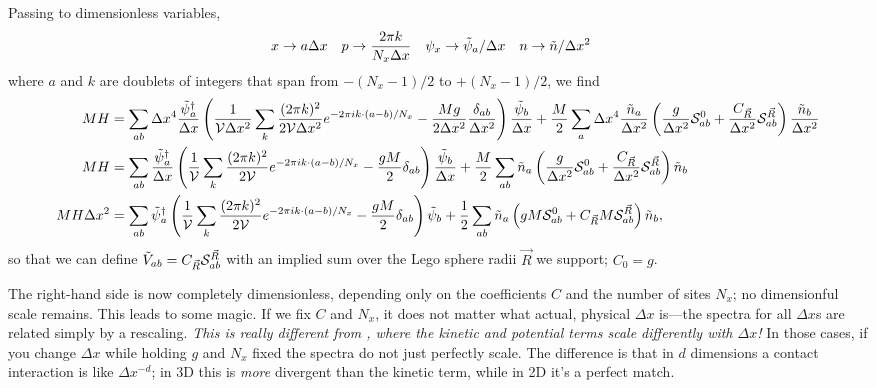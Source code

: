 Passing to dimensionless variables,
\begin{align}
	x & \rightarrow a \Delta x
	&
	p &\rightarrow \frac{2\pi k}{N_x \Delta x}
	&
	\psi_x & \rightarrow \tilde{\psi}_a / \Delta x
	&
	n &\rightarrow \tilde{n} / \Delta x^2
\end{align}
where $a$ and $k$ are doublets of integers that span from $-(N_x-1)/2$ to $+(N_x-1)/2$, we find
\begin{align}
	MH &= 
		\sum_{ab}\Delta x^4 \frac{\tilde{\psi}{}^{\dagger}_a}{\Delta x} \left(
				\frac{1}{\mathcal{V} \Delta x^2} \sum_{k} \frac{(2\pi k)^2}{2 \mathcal{V} \Delta x^2} e^{-2\pi i k \cdot(a-b)/N_x} 
				- \frac{Mg}{2\Delta x^2} \frac{\delta_{ab}}{\Delta x^2}
			\right) \frac{\tilde{\psi}_b}{\Delta x}
		+ \frac{M}{2} \sum_{a} \Delta x^4 \frac{\tilde{n}_a}{\Delta x^2} \left(
				\frac{g}{\Delta x^2} \mathcal{S}^{0}_{ab}
				+ \frac{C_{\vec{R}}}{\Delta x^2} \mathcal{S}^{\vec{R}}_{ab}
			\right) \frac{\tilde{n}_b}{\Delta x^2}
	\\
	MH &=
		\sum_{ab}\frac{\tilde{\psi}{}^{\dagger}_a}{\Delta x} \left(
			\frac{1}{\mathcal{V}} \sum_{k} \frac{(2\pi k)^2}{2 \mathcal{V}} e^{-2\pi i k \cdot(a-b)/N_x} 
			- \frac{gM}{2} \delta_{ab}
			\right) \frac{\tilde{\psi}_b}{\Delta x}
		+ \frac{M}{2} \sum_{ab} \tilde{n}_a \left(
				\frac{g}{\Delta x^2} \mathcal{S}^{0}_{ab}
				+ \frac{C_{\vec{R}}}{\Delta x^2} \mathcal{S}^{\vec{R}}_{ab}
			\right) \tilde{n}_b
	\\
	MH \Delta x^2 &=
		\sum_{ab} \tilde{\psi}{}^{\dagger}_a \left(
			\frac{1}{\mathcal{V}} \sum_{k} \frac{(2\pi k)^2}{2 \mathcal{V}} e^{-2\pi i k \cdot(a-b)/N_x} 
			- \frac{gM}{2} \delta_{ab}
			\right) \tilde{\psi}_b
		+ \frac{1}{2} \sum_{ab} \tilde{n}_a \left(
				gM \mathcal{S}^{0}_{ab}
				+ C_{\vec{R}} M \mathcal{S}^{\vec{R}}_{ab}
			\right) \tilde{n}_b,
\end{align}
so that we can define $\tilde{V}_{ab} = C_{\vec{R}} \mathcal{S}^{\vec{R}}_{ab}$ with an implied sum over the Lego sphere radii $\vec{R}$ we support; $C_0 = g$.

The right-hand side is now completely dimensionless, depending only on the coefficients $C$ and the number of sites $N_x$; no dimensionful scale remains.
This leads to some magic.
If we fix $C$ and $N_x$, it does not matter what actual, physical $\Delta x$ is---the spectra for all $\Delta x$s are related simply by a rescaling.
\emph{This is really different from , where the kinetic and potential terms scale differently with $\Delta x$!}
In those cases, if you change $\Delta x$ while holding $g$ and $N_x$ fixed the spectra do not just perfectly scale.
The difference is that in $d$ dimensions a contact interaction is like $\Delta x^{-d}$; in 3D this is \emph{more} divergent than the kinetic term, while in 2D it's a perfect match.

